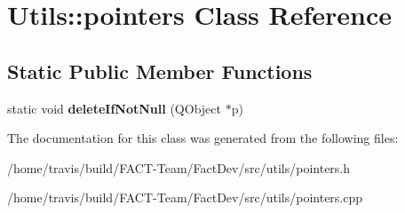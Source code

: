 \hypertarget{classUtils_1_1pointers}{\section{Utils\-:\-:pointers Class Reference}
\label{classUtils_1_1pointers}
}
\subsection*{Static Public Member Functions}
\begin{DoxyCompactItemize}
\item 
\hypertarget{classUtils_1_1pointers_ad9a69267f8f8fff8a092fcee8a3d49ac}{static void {\bfseries delete\-If\-Not\-Null} (Q\-Object $\ast$p)}\label{classUtils_1_1pointers_ad9a69267f8f8fff8a092fcee8a3d49ac}

\end{DoxyCompactItemize}


The documentation for this class was generated from the following files\-:\begin{DoxyCompactItemize}
\item 
/home/travis/build/\-F\-A\-C\-T-\/\-Team/\-Fact\-Dev/src/utils/pointers.\-h\item 
/home/travis/build/\-F\-A\-C\-T-\/\-Team/\-Fact\-Dev/src/utils/pointers.\-cpp\end{DoxyCompactItemize}
